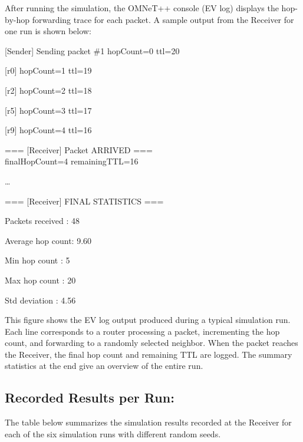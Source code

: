 \documentclass[12pt,a4paper]{article}
\begin{document}
\justifying
After running the simulation, the OMNeT++ console (EV log) displays the hop-by-hop forwarding trace for each packet. A sample output from the Receiver for one run is shown below:

\begin{tcolorbox}[
colback=codegray,
colframe=gray!50,
fontupper=\ttfamily\small,
breakable
]

[Sender] Sending packet \#1 hopCount=0 ttl=20

[r0] hopCount=1 ttl=19

[r2] hopCount=2 ttl=18

[r5] hopCount=3 ttl=17

[r9] hopCount=4 ttl=16

=== [Receiver] Packet ARRIVED === \\
finalHopCount=4 remainingTTL=16

\ldots

=== [Receiver] FINAL STATISTICS ===

Packets received : 48

Average hop count: 9.60

Min hop count    : 5

Max hop count    : 20

Std deviation    : 4.56

\end{tcolorbox}

\justifying
This figure shows the EV log output produced during a typical simulation run. Each line corresponds to a router processing a packet, incrementing the hop count, and forwarding to a randomly selected neighbor. When the packet reaches the Receiver, the final hop count and remaining TTL are logged. The summary statistics at the end give an overview of the entire run.

\subsection{Recorded Results per Run: }

\justifying
The table below summarizes the simulation results recorded at the Receiver for each of the six simulation runs with different random seeds.
\end{document}
